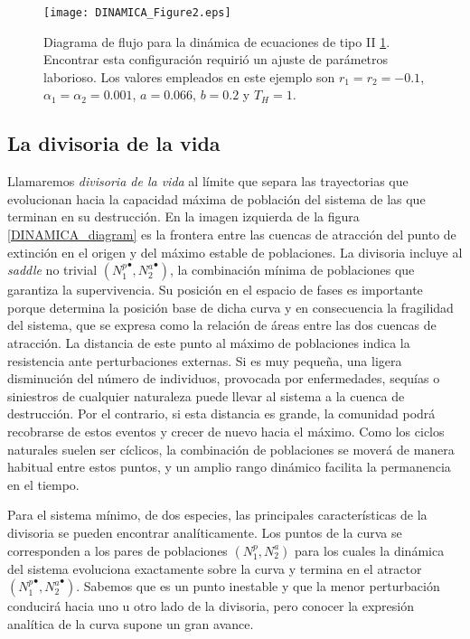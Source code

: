 \begin{figure}
\centering
\texttt{[image: DINAMICA\_Figure2.eps]}
\caption {Diagrama de flujo para la dinámica de ecuaciones de tipo II \ref{DINAMICA_typeII}. Encontrar esta configuración requirió un ajuste de parámetros laborioso. Los valores empleados en este ejemplo son $r_1 = r_2 = -0.1$, $\alpha_1 = \alpha_2 = 0.001$, $a = 0.066$, $b = 0.2$ y $T_H = 1$.}
\label{DINAMICA_typeII}
\end{figure}

\subsection{La divisoria de la vida}
\label{watershed}

Llamaremos \textit{divisoria de la vida} al límite que separa las trayectorias que evolucionan hacia la capacidad máxima de población del sistema de las que terminan en su destrucción. En la imagen izquierda de la figura \ref{DINAMICA_diagram} es la frontera entre las cuencas de atracción del punto de extinción en el origen y del máximo estable de poblaciones. La divisoria incluye al \textit{saddle} no trivial $({N_1^p}^\bullet,{N_2^a}^\bullet)$, la combinación mínima de poblaciones que garantiza la supervivencia. Su posición en el espacio de fases es importante porque determina la posición base de dicha curva y en consecuencia la fragilidad del sistema, que se expresa como la relación de áreas entre las dos cuencas de atracción. La distancia de este punto al máximo de poblaciones indica la resistencia ante perturbaciones externas. Si es muy pequeña, una ligera disminución del número de individuos, provocada por enfermedades, sequías o siniestros de cualquier naturaleza puede llevar al sistema a la cuenca de destrucción. Por el contrario, si esta distancia es grande, la comunidad podrá recobrarse de estos eventos y crecer de nuevo hacia el máximo. Como los ciclos naturales suelen ser cíclicos, la combinación de poblaciones se moverá de manera habitual entre estos puntos, y un amplio rango dinámico facilita la permanencia en el tiempo. 

Para el sistema mínimo, de dos especies, las principales características de la divisoria se pueden encontrar analíticamente. Los puntos de la curva se corresponden a los pares de poblaciones $({N_1^p},{N_2^a})$ para los cuales la dinámica del sistema evoluciona exactamente sobre la curva y termina en el atractor $({N_1^p}^\bullet,{N_2^a}^\bullet)$. Sabemos que es un punto inestable y que la menor perturbación conducirá hacia uno u otro lado de la divisoria, pero conocer la expresión analítica de la curva supone un gran avance.  

